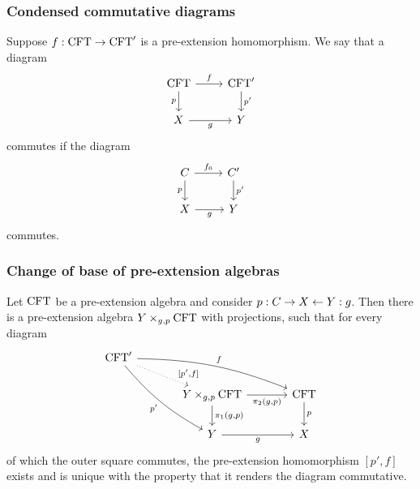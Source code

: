 \documentclass[handout]{beamer}
\newcommand\important[1]{\textbf{\color{red!90!black}#1}}
\begin{document}
\begin{frame}
\frametitle{\bf Condensed commutative diagrams}
Suppose $f:\mathrm{CFT}\to\mathrm{CFT}'$ is a pre-extension homomorphism. We say that
a diagram
\begin{equation*}
\begin{tikzcd}[ampersand replacement=\&]
\stesys
  \ar{r}{f}
  \ar{d}[swap]{p}
  \&
\stesys'
  \ar{d}{p'}
  \\
X \ar{r}[swap]{g}
  \&
Y
\end{tikzcd}
\end{equation*}
commutes if the diagram
\begin{equation*}
\begin{tikzcd}[ampersand replacement=\&]
\stesysc
  \ar{r}{f_0}
  \ar{d}[swap]{p}
  \&
\stesysc'
  \ar{d}{p'}
  \\
X \ar{r}[swap]{g}
  \&
Y
\end{tikzcd}
\end{equation*}
commutes.
\end{frame}

\begin{frame}
\frametitle{\bf Change of base of pre-extension algebras}
Let $\mathrm{CFT}$ be a pre-extension algebra and consider $p:C\rightarrow X\leftarrow Y:g$.
Then there is a pre-extension algebra \important{$\cobesys{Y}{\stesys}{g}{p}$} with projections, such that for every diagram
\begin{equation*}
\begin{tikzcd}[ampersand replacement=\&,column sep=large]
\stesys'
  \ar[bend right=10]{ddr}[swap]{p'}
  \ar[bend left=10]{rrd}{f}
  \ar[dotted]{dr}[near end]{[p',f]}
  \\
  {}\&
\cobesys{Y}{\stesys}{g}{p}
  \ar{d}{\pullbackpr{1}{g}{p}}
  \ar{r}[swap]{\pullbackpr{2}{g}{p}}
  \&
\stesys
  \ar{d}{p}
  \\
  {}\&
Y \ar{r}[swap]{g}
  \&
X
\end{tikzcd}
\end{equation*}
of which the outer square commutes, the pre-extension homomorphism \important{$[p',f]$} exists
and is unique with the property that it renders the diagram commutative.
\end{frame}
\end{document}
